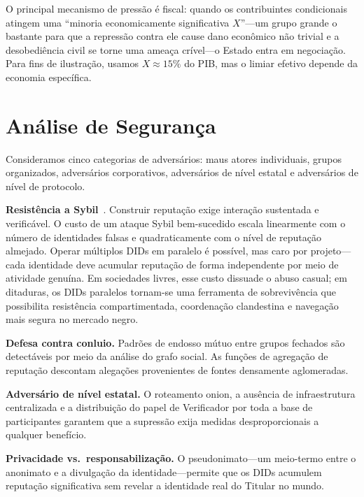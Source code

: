 \documentclass[11pt,a4paper,twocolumn]{article}
\begin{document}
O principal mecanismo de pressão é fiscal: quando os contribuintes condicionais atingem uma ``minoria economicamente significativa $X$''---um grupo grande o bastante para que a repressão contra ele cause dano econômico não trivial e a desobediência civil se torne uma ameaça crível---o Estado entra em negociação. Para fins de ilustração, usamos $X \approx 15\%$ do PIB, mas o limiar efetivo depende da economia específica.

\section{Análise de Segurança}

Consideramos cinco categorias de adversários: maus atores individuais, grupos organizados, adversários corporativos, adversários de nível estatal e adversários de nível de protocolo.

\textbf{Resistência a Sybil}~\cite{douceur2002}. Construir reputação exige interação sustentada e verificável. O custo de um ataque Sybil bem-sucedido escala linearmente com o número de identidades falsas e quadraticamente com o nível de reputação almejado. Operar múltiplos DIDs em paralelo é possível, mas caro por projeto---cada identidade deve acumular reputação de forma independente por meio de atividade genuína. Em sociedades livres, esse custo dissuade o abuso casual; em ditaduras, os DIDs paralelos tornam-se uma ferramenta de sobrevivência que possibilita resistência compartimentada, coordenação clandestina e navegação mais segura no mercado negro.

\textbf{Defesa contra conluio.} Padrões de endosso mútuo entre grupos fechados são detectáveis por meio da análise do grafo social. As funções de agregação de reputação descontam alegações provenientes de fontes densamente aglomeradas.

\textbf{Adversário de nível estatal.} O roteamento onion, a ausência de infraestrutura centralizada e a distribuição do papel de Verificador por toda a base de participantes garantem que a supressão exija medidas desproporcionais a qualquer benefício.

\textbf{Privacidade vs.\ responsabilização.} O pseudonimato---um meio-termo entre o anonimato e a divulgação da identidade---permite que os DIDs acumulem reputação significativa sem revelar a identidade real do Titular no mundo.
\end{document}
